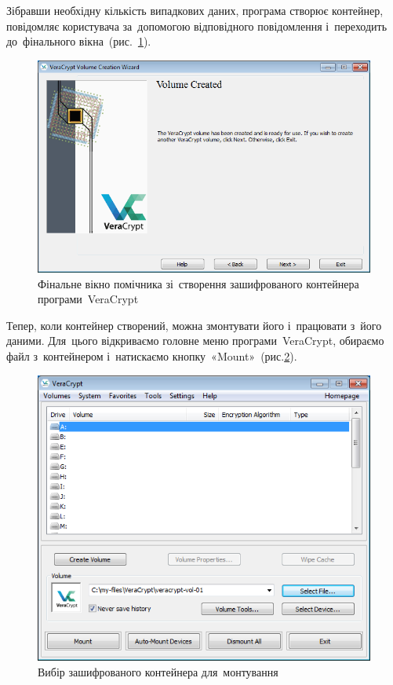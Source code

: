 \documentclass[
	a4paper,
	oneside,
	BCOR = 10mm,
	DIV = 12,
	12pt,
	headings = normal,
]{scrartcl}
\begin{document}
		Зібравши необхідну кількість випадкових даних, програма створює контейнер, повідомляє користувача за~допомогою відповідного повідомлення і~переходить до~фінального вікна~(рис.~\ref{fig:vc-wizard-final}).

		\begin{figure}[!htbp]
			\centering
			\includegraphics[height = 10 \baselineskip]{./assets/11.png}
			\caption{Фінальне вікно помічника зі~створення зашифрованого контейнера програми~\textenglish{VeraCrypt}}
			\label{fig:vc-wizard-final}
		\end{figure}

		Тепер, коли контейнер створений, можна змонтувати його і~працювати з~його даними. Для~цього відкриваємо головне меню програми~\textenglish{VeraCrypt}, обираємо файл з~контейнером і~натискаємо кнопку~«\textenglish{Mount}»~(рис.\ref{fig:vc-mount}).

		\begin{figure}[!htbp]
			\centering
			\includegraphics[height = 10 \baselineskip]{./assets/12.png}
			\caption{Вибір зашифрованого контейнера для~монтування}
			\label{fig:vc-mount}
		\end{figure}
\end{document}
